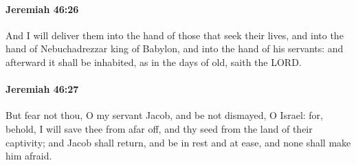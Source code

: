 		\paragraph{Jeremiah 46:26} %
			\label{JEREMIAH-46-26}

			And I will deliver them into the hand of those that seek their lives, and into the hand of Nebuchadrezzar king of Babylon, and into the hand of his servants: and afterward it shall be inhabited, as in the days of old, saith the LORD.


		\paragraph{Jeremiah 46:27} %
			\label{JEREMIAH-46-27}

			But fear not thou, O my servant Jacob, and be not dismayed, O Israel: for, behold, I will save thee from afar off, and thy seed from the land of their captivity; and Jacob shall return, and be in rest and at ease, and none shall make him afraid.

